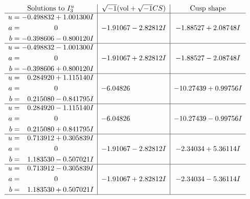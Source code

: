 \documentclass[1p]{elsarticle_modified}
\theoremstyle{definition}
\newcommand{\I}{\sqrt{-1}}
\begin{document}
$$\begin{array}{c|c|c}  
\text{Solutions to }I^u_{3}& \I (\text{vol} + \sqrt{-1}CS) & \text{Cusp shape}\\
 \hline 
\begin{aligned}
u &= -0.498832 + 1.001300 I \\
a &= \phantom{-0.000000 } 0 \\
b &= -0.398606 - 0.800120 I\end{aligned}
 & -1.91067 - 2.82812 I & -1.88527 + 2.08748 I \\ \hline\begin{aligned}
u &= -0.498832 - 1.001300 I \\
a &= \phantom{-0.000000 } 0 \\
b &= -0.398606 + 0.800120 I\end{aligned}
 & -1.91067 + 2.82812 I & -1.88527 - 2.08748 I \\ \hline\begin{aligned}
u &= \phantom{-}0.284920 + 1.115140 I \\
a &= \phantom{-0.000000 } 0 \\
b &= \phantom{-}0.215080 - 0.841795 I\end{aligned}
 & -6.04826\phantom{ +0.000000I} & -10.27439 + 0.99756 I \\ \hline\begin{aligned}
u &= \phantom{-}0.284920 - 1.115140 I \\
a &= \phantom{-0.000000 } 0 \\
b &= \phantom{-}0.215080 + 0.841795 I\end{aligned}
 & -6.04826\phantom{ +0.000000I} & -10.27439 - 0.99756 I \\ \hline\begin{aligned}
u &= \phantom{-}0.713912 + 0.305839 I \\
a &= \phantom{-0.000000 } 0 \\
b &= \phantom{-}1.183530 - 0.507021 I\end{aligned}
 & -1.91067 - 2.82812 I & -2.34034 + 5.36114 I \\ \hline\begin{aligned}
u &= \phantom{-}0.713912 - 0.305839 I \\
a &= \phantom{-0.000000 } 0 \\
b &= \phantom{-}1.183530 + 0.507021 I\end{aligned}
 & -1.91067 + 2.82812 I & -2.34034 - 5.36114 I\\
 \hline 
 \end{array}$$\newpage
\end{document}
